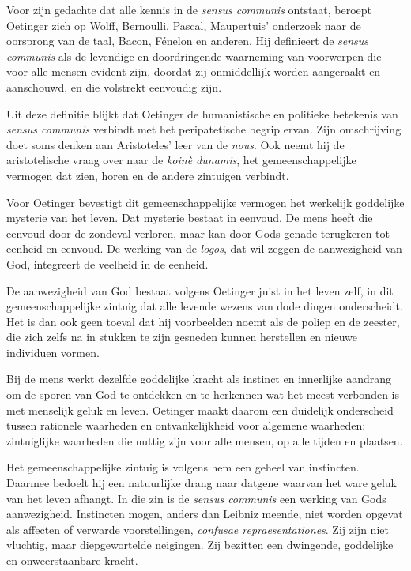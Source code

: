 Voor zijn gedachte dat alle kennis in de \textit{sensus communis} ontstaat, beroept Oetinger zich op Wolff, Bernoulli, Pascal, Maupertuis' onderzoek naar de oorsprong van de taal, Bacon, Fénelon en anderen. Hij definieert de \textit{sensus communis} als de levendige en doordringende waarneming van voorwerpen die voor alle mensen evident zijn, doordat zij onmiddellijk worden aangeraakt en aanschouwd, en die volstrekt eenvoudig zijn.

Uit deze definitie blijkt dat Oetinger de humanistische en politieke betekenis van \textit{sensus communis} verbindt met het peripatetische begrip ervan. Zijn omschrijving doet soms denken aan Aristoteles' leer van de \textit{nous}. Ook neemt hij de aristotelische vraag over naar de \textit{koinè dunamis}, het gemeenschappelijke vermogen dat zien, horen en de andere zintuigen verbindt.

Voor Oetinger bevestigt dit gemeenschappelijke vermogen het werkelijk goddelijke mysterie van het leven. Dat mysterie bestaat in eenvoud. De mens heeft die eenvoud door de zondeval verloren, maar kan door Gods genade terugkeren tot eenheid en eenvoud. De werking van de \textit{logos}, dat wil zeggen de aanwezigheid van God, integreert de veelheid in de eenheid.

De aanwezigheid van God bestaat volgens Oetinger juist in het leven zelf, in dit gemeenschappelijke zintuig dat alle levende wezens van dode dingen onderscheidt. Het is dan ook geen toeval dat hij voorbeelden noemt als de poliep en de zeester, die zich zelfs na in stukken te zijn gesneden kunnen herstellen en nieuwe individuen vormen.

Bij de mens werkt dezelfde goddelijke kracht als instinct en innerlijke aandrang om de sporen van God te ontdekken en te herkennen wat het meest verbonden is met menselijk geluk en leven. Oetinger maakt daarom een duidelijk onderscheid tussen rationele waarheden en ontvankelijkheid voor algemene waarheden: zintuiglijke waarheden die nuttig zijn voor alle mensen, op alle tijden en plaatsen.

Het gemeenschappelijke zintuig is volgens hem een geheel van instincten. Daarmee bedoelt hij een natuurlijke drang naar datgene waarvan het ware geluk van het leven afhangt. In die zin is de \textit{sensus communis} een werking van Gods aanwezigheid. Instincten mogen, anders dan Leibniz meende, niet worden opgevat als affecten of verwarde voorstellingen, \textit{confusae repraesentationes}. Zij zijn niet vluchtig, maar diepgewortelde neigingen. Zij bezitten een dwingende, goddelijke en onweerstaanbare kracht.

